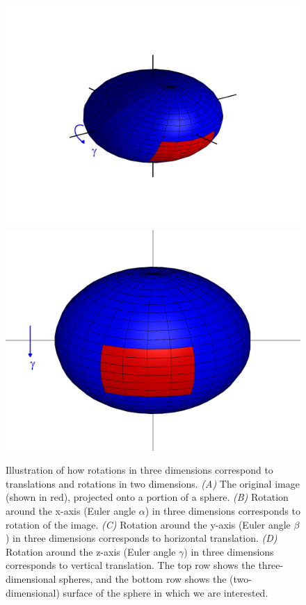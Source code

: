 \documentclass{pnastwo}
\begin{document}
\begin{figure}
\begin{minipage}{0.2\textwidth}
\end{minipage}
\begin{minipage}{0.2\textwidth} 
\centering
\includegraphics[width=\textwidth]{sphere_4}\\
\includegraphics[width=\textwidth]{sphere2_4}\\
\end{minipage}
\caption{Illustration of how rotations in three dimensions correspond to translations and rotations in two dimensions. {\it (A)} The original image (shown in red), projected onto a portion of a sphere. {\it (B)} Rotation around the x-axis (Euler angle $\alpha$) in three dimensions corresponds to rotation of the image. {\it (C)} Rotation around the y-axis (Euler angle $\beta$) in three dimensions corresponds to horizontal translation. {\it (D)} Rotation around the z-axis (Euler angle $\gamma$) in three dimensions corresponds to vertical translation. The top row shows the three-dimensional spheres, and the bottom row shows the (two-dimensional) surface of the sphere in which we are interested.}
\label{fig:SO3_picture}
\end{figure}
\end{document}
